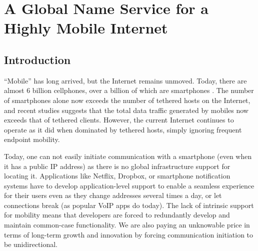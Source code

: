 \chapter{A Global Name Service for a Highly Mobile Internet}
\label{ch:auspice}
\vsp
\section{Introduction}
\vsp

``Mobile'' has long arrived, but the Internet remains unmoved. Today, there are almost 6 billion cellphones, over a billion of which are smartphones \cite{gartner}. The number of smartphones alone now exceeds the number of tethered hosts on the Internet, and recent studies \cite{cisco} suggests that the total data traffic generated by mobiles now exceeds that of tethered clients. However, the current Internet continues to operate as it did when dominated by tethered hosts, simply ignoring frequent endpoint mobility.

Today, one can not easily initiate communication with a smartphone (even when it has a public IP address) as there is no global infrastructure support for locating it. Applications like Netflix, Dropbox, or smartphone notification systems have to develop application-level support to enable a seamless experience for their users even as they change addresses several times a day, or let connections break (as popular VoIP apps do today).   The lack of intrinsic support for mobility means that developers are forced to redundantly develop and maintain common-case functionality. We are also paying an unknowable price in terms of long-term growth and innovation by forcing communication initiation to be unidirectional.



